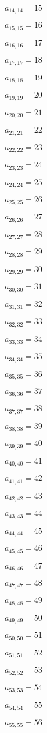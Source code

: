 \documentclass[a4paper,12pt]{article}
\begin{document}
$a _{ 14, 14 } = 15$

$a _{ 15, 15 } = 16$

$a _{ 16, 16 } = 17$

$a _{ 17, 17 } = 18$

$a _{ 18, 18 } = 19$

$a _{ 19, 19 } = 20$

$a _{ 20, 20 } = 21$

$a _{ 21, 21 } = 22$

$a _{ 22, 22 } = 23$

$a _{ 23, 23 } = 24$

$a _{ 24, 24 } = 25$

$a _{ 25, 25 } = 26$

$a _{ 26, 26 } = 27$

$a _{ 27, 27 } = 28$

$a _{ 28, 28 } = 29$

$a _{ 29, 29 } = 30$

$a _{ 30, 30 } = 31$

$a _{ 31, 31 } = 32$

$a _{ 32, 32 } = 33$

$a _{ 33, 33 } = 34$

$a _{ 34, 34 } = 35$

$a _{ 35, 35 } = 36$

$a _{ 36, 36 } = 37$

$a _{ 37, 37 } = 38$

$a _{ 38, 38 } = 39$

$a _{ 39, 39 } = 40$

$a _{ 40, 40 } = 41$

$a _{ 41, 41 } = 42$

$a _{ 42, 42 } = 43$

$a _{ 43, 43 } = 44$

$a _{ 44, 44 } = 45$

$a _{ 45, 45 } = 46$

$a _{ 46, 46 } = 47$

$a _{ 47, 47 } = 48$

$a _{ 48, 48 } = 49$

$a _{ 49, 49 } = 50$

$a _{ 50, 50 } = 51$

$a _{ 51, 51 } = 52$

$a _{ 52, 52 } = 53$

$a _{ 53, 53 } = 54$

$a _{ 54, 54 } = 55$

$a _{ 55, 55 } = 56$
\end{document}
